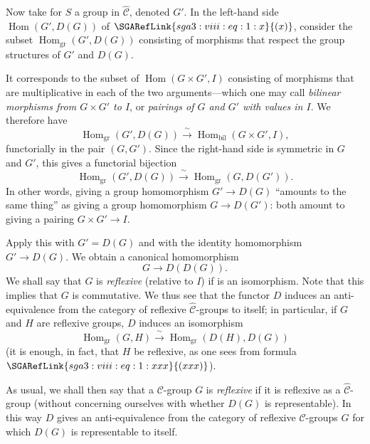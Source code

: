 Now take for \(S\) a group in \(\widehat{\mathscr C}\), denoted \(G'\). In
the left-hand side \(\operatorname{Hom}(G',D(G))\) of
\(\SGARefLink{sga3:viii:eq:1:x}{(x)}\), consider the subset
\(\operatorname{Hom}_{\mathrm{gr}}(G',D(G))\) consisting of morphisms that
respect the group structures of \(G'\) and \(D(G)\).

It corresponds to the subset of \(\operatorname{Hom}(G\times G',I)\)
consisting of morphisms that are multiplicative in each of the two
arguments---which one may call \emph{bilinear morphisms from
\(G\times G'\) to \(I\)}, or \emph{pairings of \(G\) and \(G'\) with
values in \(I\)}. We therefore have
\begin{equation}
  \tag{xx}
  \operatorname{Hom}_{\mathrm{gr}}(G',D(G))
  \xrightarrow{\ \sim\ }
  \operatorname{Hom}_{\mathrm{bil}}(G\times G',I),
\end{equation}
functorially in the pair \((G,G')\). Since the right-hand side is symmetric
in \(G\) and \(G'\), this gives a functorial bijection
\begin{equation}
  \tag{xxx}
  \operatorname{Hom}_{\mathrm{gr}}(G',D(G))
  \xrightarrow{\ \sim\ }
  \operatorname{Hom}_{\mathrm{gr}}(G,D(G')).
\end{equation}
In other words, giving a group homomorphism \(G'\to D(G)\) ``amounts to the
same thing'' as giving a group homomorphism \(G\to D(G')\): both amount to
giving a pairing \(G\times G'\to I\).

Apply this with \(G'=D(G)\) and with the identity homomorphism
\(G'\to D(G)\). We obtain a canonical homomorphism
\begin{equation}
  \tag{xxxx}
  G\longrightarrow D(D(G)).
\end{equation}
We shall say that \(G\) is \emph{reflexive} (relative to \(I\)) if
 is an isomorphism. Note that this implies
that \(G\) is commutative. We thus see that the functor \(D\) induces an
anti-equivalence from the category of reflexive
\(\widehat{\mathscr C}\)-groups to itself; in particular, if \(G\) and \(H\)
are reflexive groups, \(D\) induces an isomorphism
\[
  \operatorname{Hom}_{\mathrm{gr}}(G,H)
  \xrightarrow{\ \sim\ }
  \operatorname{Hom}_{\mathrm{gr}}(D(H),D(G))
\]
(it is enough, in fact, that \(H\) be reflexive, as one sees from formula
\(\SGARefLink{sga3:viii:eq:1:xxx}{(xxx)}\)).

As usual, we shall then say that a \(\mathscr C\)-group \(G\) is
\emph{reflexive} if it is reflexive as a \(\widehat{\mathscr C}\)-group
(without concerning ourselves with whether \(D(G)\) is representable). In
this way \(D\) gives an anti-equivalence from the category of reflexive
\(\mathscr C\)-groups \(G\) for which \(D(G)\) is representable to itself.

